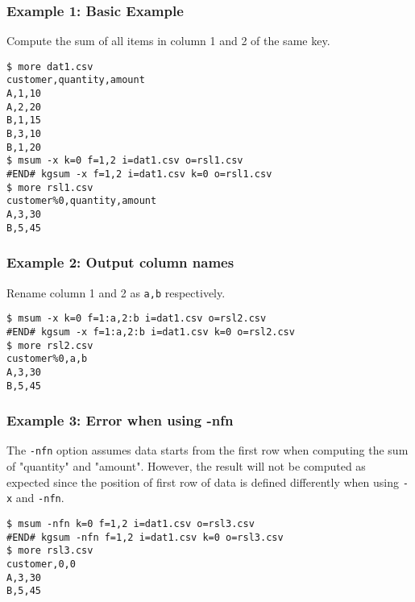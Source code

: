 \subsubsection*{Example 1: Basic Example}

Compute the sum of all items in column 1 and 2 of the same key. 


\begin{Verbatim}[baselinestretch=0.7,frame=single]
$ more dat1.csv
customer,quantity,amount
A,1,10
A,2,20
B,1,15
B,3,10
B,1,20
$ msum -x k=0 f=1,2 i=dat1.csv o=rsl1.csv
#END# kgsum -x f=1,2 i=dat1.csv k=0 o=rsl1.csv
$ more rsl1.csv
customer%0,quantity,amount
A,3,30
B,5,45
\end{Verbatim}
\subsubsection*{Example 2: Output column names}

Rename column 1 and 2 as \verb|a,b| respectively. 


\begin{Verbatim}[baselinestretch=0.7,frame=single]
$ msum -x k=0 f=1:a,2:b i=dat1.csv o=rsl2.csv
#END# kgsum -x f=1:a,2:b i=dat1.csv k=0 o=rsl2.csv
$ more rsl2.csv
customer%0,a,b
A,3,30
B,5,45
\end{Verbatim}
\subsubsection*{Example 3: Error when using -nfn}

The \verb|-nfn| option assumes data starts from the first row when computing the sum of "quantity" and "amount". However, the result will not be computed as expected since the position of first row of data is defined differently when using \verb|-x| and \verb|-nfn|. 


\begin{Verbatim}[baselinestretch=0.7,frame=single]
$ msum -nfn k=0 f=1,2 i=dat1.csv o=rsl3.csv
#END# kgsum -nfn f=1,2 i=dat1.csv k=0 o=rsl3.csv
$ more rsl3.csv
customer,0,0
A,3,30
B,5,45
\end{Verbatim}
